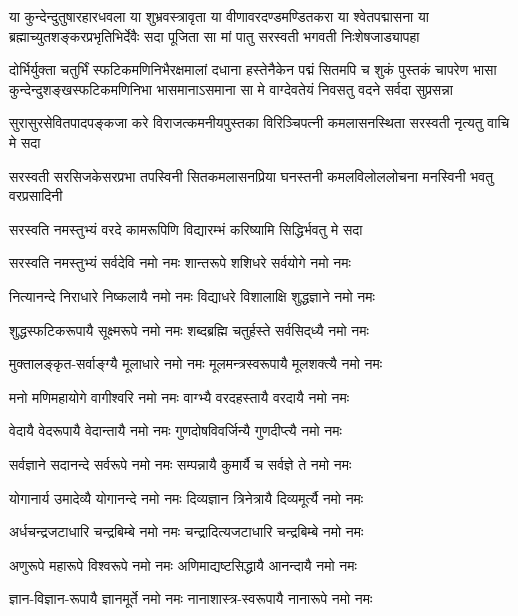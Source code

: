 

\fourlineindentedshloka
{या कुन्देन्दुतुषारहारधवला या शुभ्रवस्त्रावृता}
{या वीणावरदण्डमण्डितकरा या श्वेतपद्मासना}
{या ब्रह्माच्युतशङ्करप्रभृतिभिर्देवैः सदा पूजिता}
{सा मां पातु सरस्वती भगवती निःशेषजाड्यापहा}

\fourlineindentedshloka
{दोर्भिर्युक्ता चतुर्भिं स्फटिकमणिनिभैरक्षमालां दधाना}
{हस्तेनैकेन पद्मं सितमपि च शुकं पुस्तकं चापरेण}
{भासा कुन्देन्दुशङ्खस्फटिकमणिनिभा भासमानाऽसमाना}
{सा मे वाग्देवतेयं निवसतु वदने सर्वदा सुप्रसन्ना}

\fourlineindentedshloka
{सुरासुरसेवितपादपङ्कजा}
{करे विराजत्कमनीयपुस्तका}
{विरिञ्चिपत्नी कमलासनस्थिता}
{सरस्वती नृत्यतु वाचि मे सदा}

\fourlineindentedshloka
{सरस्वती सरसिजकेसरप्रभा}
{तपस्विनी सितकमलासनप्रिया}
{घनस्तनी कमलविलोललोचना}
{मनस्विनी भवतु वरप्रसादिनी}

\twolineshloka
{सरस्वति नमस्तुभ्यं वरदे कामरूपिणि}
{विद्यारम्भं करिष्यामि सिद्धिर्भवतु मे सदा}

\twolineshloka
{सरस्वति नमस्तुभ्यं सर्वदेवि नमो नमः}
{शान्तरूपे शशिधरे सर्वयोगे नमो नमः}

\twolineshloka
{नित्यानन्दे निराधारे निष्कलायै नमो नमः}
{विद्याधरे विशालाक्षि शुद्धज्ञाने नमो नमः}

\twolineshloka
{शुद्धस्फटिकरूपायै सूक्ष्मरूपे नमो नमः}
{शब्दब्रह्मि चतुर्हस्ते सर्वसिद्‌ध्यै नमो नमः}

\twolineshloka
{मुक्तालङ्कृत-सर्वाङ्ग्यै मूलाधारे नमो नमः}
{मूलमन्त्रस्वरूपायै मूलशक्त्यै नमो नमः}

\twolineshloka
{मनो मणिमहायोगे वागीश्वरि नमो नमः}
{वाग्भ्यै वरदहस्तायै वरदायै नमो नमः}

\twolineshloka
{वेदायै वेदरूपायै वेदान्तायै नमो नमः}
{गुणदोषविवर्जिन्यै गुणदीप्त्यै नमो नमः}

\twolineshloka
{सर्वज्ञाने सदानन्दे सर्वरूपे नमो नमः}
{सम्पन्नायै कुमार्यै च सर्वज्ञे ते नमो नमः}

\twolineshloka
{योगानार्य उमादेव्यै योगानन्दे नमो नमः}
{दिव्यज्ञान त्रिनेत्रायै दिव्यमूर्त्यै नमो नमः}

\twolineshloka
{अर्धचन्द्रजटाधारि चन्द्रबिम्बे नमो नमः}
{चन्द्रादित्यजटाधारि चन्द्रबिम्बे नमो नमः}

\twolineshloka
{अणुरूपे महारूपे विश्वरूपे नमो नमः}
{अणिमाद्यष्टसिद्धायै आनन्दायै नमो नमः}

\twolineshloka
{ज्ञान-विज्ञान-रूपायै ज्ञानमूर्ते नमो नमः}
{नानाशास्त्र-स्वरूपायै नानारूपे नमो नमः}


